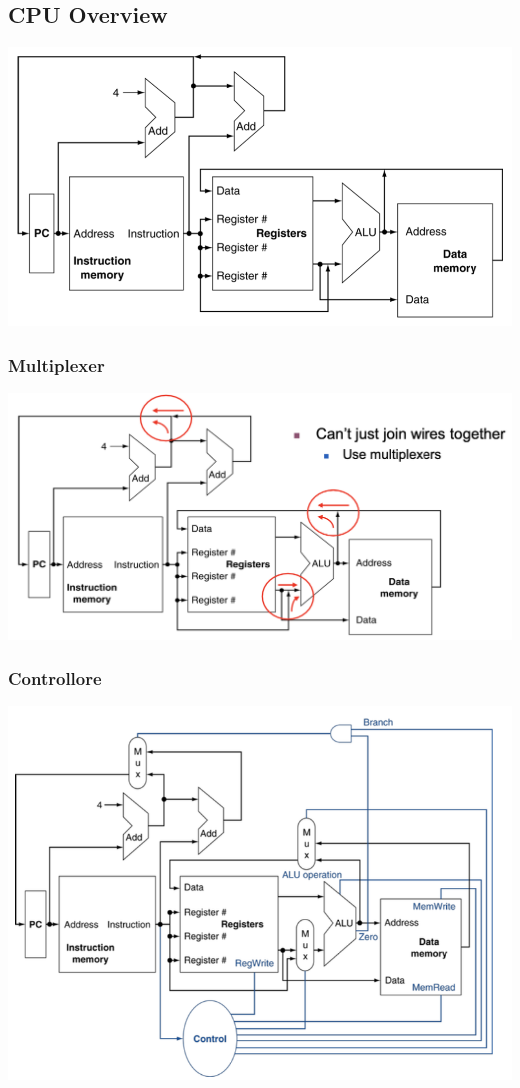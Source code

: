 \documentclass[12pt,a4paper]{article}
\begin{document}
\subsection{CPU Overview}
\begin{center}
\includegraphics[width=0.5\columnwidth]{img/cpu.png}
\end{center}

\subsubsection{Multiplexer}
\begin{center}
\includegraphics[width=0.5\columnwidth]{img/multiplexer.png}
\end{center}

\subsubsection{Controllore}
\begin{center}
\includegraphics[width=0.5\columnwidth]{img/control.png}
\end{center}
\end{document}

